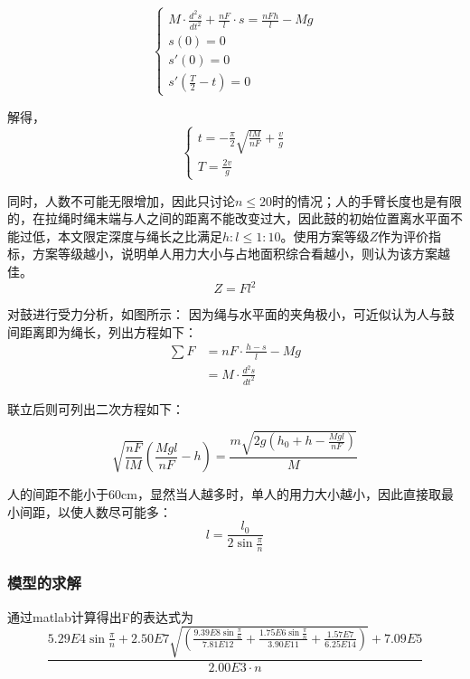 \documentclass[withoutpreface,bwprint]{cumcmthesis} %
\begin{document}
\begin{equation}
\begin{cases}
     M\cdot\frac{d^{2}s}{dt^{2}}+\frac{nF}{l}\cdot s = \frac{nFh}{l}-Mg \\
	    s\left ( 0\right )=0 \\
       s'\left ( 0 \right )=0 \\
s'(\frac{T}{2}-t)=0
\end{cases}
\end{equation}
\par
解得，
\begin{equation}
\begin{cases}
    t=-\frac{\pi}{2}\sqrt{\frac{lM}{nF}}+\frac{v}{g}\\
	T=\frac{2v}{g}
\end{cases}
\end{equation}


\par
同时，人数不可能无限增加，因此只讨论$n\leq 20$时的情况；人的手臂长度也是有限的，在拉绳时绳末端与人之间的距离不能改变过大，因此鼓的初始位置离水平面不能过低，本文限定深度与绳长之比满足$h:l\leq 1:10$。使用方案等级$Z$作为评价指标，方案等级越小，说明单人用力大小与占地面积综合看越小，则认为该方案越佳。
\begin{equation}
Z=Fl^2
\end{equation}

\par
对鼓进行受力分析，如图所示：
因为绳与水平面的夹角极小，可近似认为人与鼓间距离即为绳长，列出方程如下：
\begin{align}
\sum F  &= n F\cdot \frac{h-s}{l}-M g \\
 &=M\cdot \frac{d^{2}s}{dt^{2}}
\label{1}
\end{align}


联立后则可列出二次方程如下：

\begin{equation}
\sqrt{\frac{nF}{lM}}\left ( \frac{Mgl}{nF}-h \right )=\frac{m\sqrt{2g\left ( h_0+h-\frac{Mgl}{nF} \right )}}{M}
\end{equation}

人的间距不能小于60cm，显然当人越多时，单人的用力大小越小，因此直接取最小间距，以使人数尽可能多：
\begin{equation}
l=\frac{l_0}{2\sin\frac{\pi}{n}}
\end{equation}
	\subsubsection{模型的求解}
通过matlab计算得出F的表达式为
\begin{equation}
\frac{5.29E4\sin\frac{\pi}{n}+2.50E7\sqrt{\left ( \frac{9.39E8\sin\frac{\pi}{n}}{7.81E12} +\frac{1.75E6\sin\frac{\pi}{n}}{3.90E11}+\frac{1.57E7}{6.25E14}\right )}+7.09E5 }{2.00E3\cdot n}
\end{equation}
\end{document}
